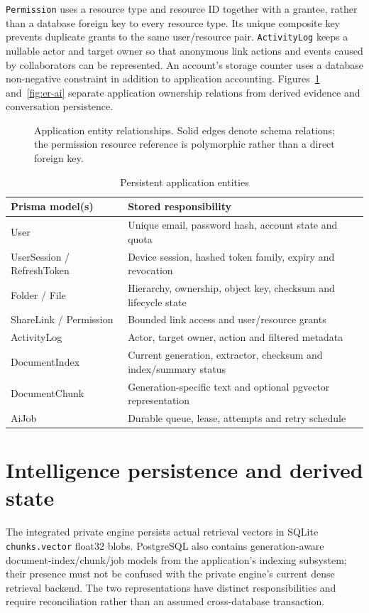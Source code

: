 \documentclass[11pt,a4paper,oneside]{report}
\newcommand{\ShortCaption}[1]{\csname ShortCaption#1\endcsname}
\newcommand{\diagram}[3]{\par\begin{figure}[htbp]\centering\sbox{\DiagramBox}{}\ifdim\wd\DiagramBox>\linewidth\resizebox{\linewidth}{!}{\usebox{\DiagramBox}}\else\usebox{\DiagramBox}\fi\caption[\ShortCaption{#1}]{#2}\label{fig:#3}\end{figure}\par}
\begin{document}
\texttt{Permission} uses a resource type and resource ID together with a grantee, rather than a database foreign key to every resource type. Its unique composite key prevents duplicate grants to the same user/resource pair. \texttt{ActivityLog} keeps a nullable actor and target owner so that anonymous link actions and events caused by collaborators can be represented. An account's storage counter uses a database non-negative constraint in addition to application accounting.
Figures~\ref{fig:er-app} and~\ref{fig:er-ai} separate application ownership relations from derived evidence and conversation persistence.
\diagram{er_application}{Application entity relationships. Solid edges denote schema relations; the permission resource reference is polymorphic rather than a direct foreign key.}{er-app}
\par\begin{table}[htbp]\caption{Persistent application entities}\small\begin{tabularx}{\linewidth}{p{.30\linewidth}Y}\toprule Prisma model(s)&Stored responsibility\\\midrule
User&Unique email, password hash, account state and quota\\
UserSession / RefreshToken&Device session, hashed token family, expiry and revocation\\
Folder / File&Hierarchy, ownership, object key, checksum and lifecycle state\\
ShareLink / Permission&Bounded link access and user/resource grants\\
ActivityLog&Actor, target owner, action and filtered metadata\\
DocumentIndex&Current generation, extractor, checksum and index/summary status\\
DocumentChunk&Generation-specific text and optional pgvector representation\\
AiJob&Durable queue, lease, attempts and retry schedule\\\bottomrule\end{tabularx}\end{table}\par
\section{Intelligence persistence and derived state}
The integrated private engine persists actual retrieval vectors in SQLite \texttt{chunks.vector} float32 blobs. PostgreSQL also contains generation-aware document-index/chunk/job models from the application's indexing subsystem; their presence must not be confused with the private engine's current dense retrieval backend. The two representations have distinct responsibilities and require reconciliation rather than an assumed cross-database transaction.
\end{document}
